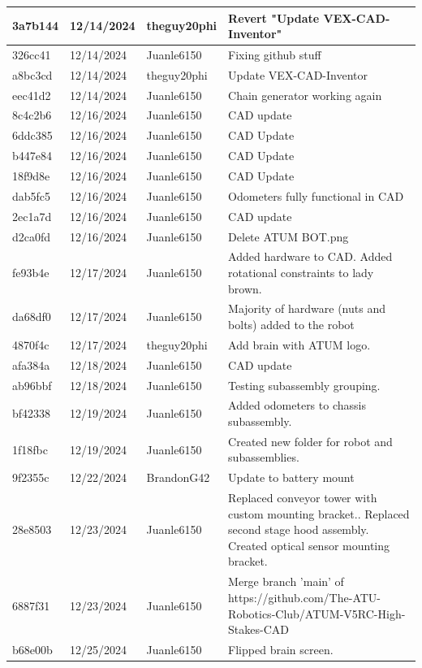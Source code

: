 \begin{center}
\begin{longtable}{|p{28pt}|p{33pt}|p{40pt}|p{300pt}|}
\hline
3a7b144 & 12/14/2024 & theguy20phi & Revert "Update VEX-CAD-Inventor" \\
\hline
326cc41 & 12/14/2024 & Juanle6150 & Fixing github stuff \\
\hline
a8bc3cd & 12/14/2024 & theguy20phi & Update VEX-CAD-Inventor \\
\hline
eec41d2 & 12/14/2024 & Juanle6150 & Chain generator working again \\
\hline
8c4c2b6 & 12/16/2024 & Juanle6150 & CAD update \\
\hline
6ddc385 & 12/16/2024 & Juanle6150 & CAD Update \\
\hline
b447e84 & 12/16/2024 & Juanle6150 & CAD Update \\
\hline
18f9d8e & 12/16/2024 & Juanle6150 & CAD Update \\
\hline
dab5fc5 & 12/16/2024 & Juanle6150 & Odometers fully functional in CAD \\
\hline
2ec1a7d & 12/16/2024 & Juanle6150 & CAD update \\
\hline
d2ca0fd & 12/16/2024 & Juanle6150 & Delete ATUM BOT.png \\
\hline
fe93b4e & 12/17/2024 & Juanle6150 & Added hardware to CAD. Added rotational  constraints to lady brown. \\
\hline
da68df0 & 12/17/2024 & Juanle6150 & Majority of hardware (nuts and bolts) added to the robot \\
\hline
4870f4c & 12/17/2024 & theguy20phi & Add brain with ATUM logo. \\
\hline
afa384a & 12/18/2024 & Juanle6150 & CAD update \\
\hline
ab96bbf & 12/18/2024 & Juanle6150 & Testing subassembly grouping. \\
\hline
bf42338 & 12/19/2024 & Juanle6150 & Added odometers to chassis subassembly. \\
\hline
1f18fbc & 12/19/2024 & Juanle6150 & Created new folder for robot and subassemblies. \\
\hline
9f2355c & 12/22/2024 & BrandonG42 & Update to battery mount \\
\hline
28e8503 & 12/23/2024 & Juanle6150 & Replaced conveyor tower with custom mounting bracket.. Replaced second stage hood assembly. Created optical sensor mounting bracket. \\
\hline
6887f31 & 12/23/2024 & Juanle6150 & Merge branch 'main' of https://github.com/The-ATU-Robotics-Club/ATUM-V5RC-High-Stakes-CAD \\
\hline
b68e00b & 12/25/2024 & Juanle6150 & Flipped brain screen. \\

\end{longtable}
\end{center}
